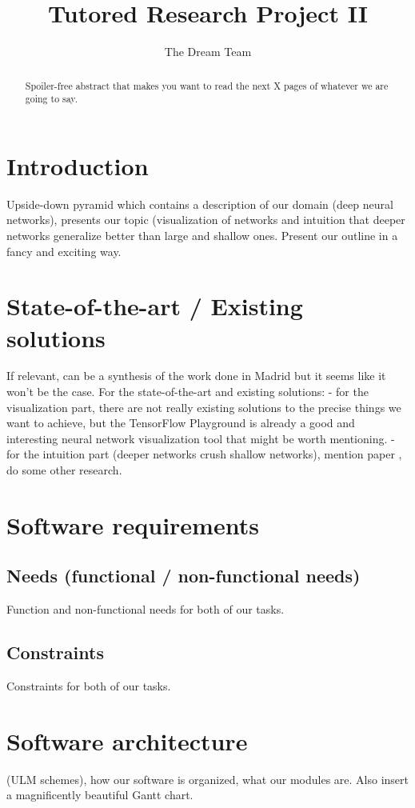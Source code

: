 \documentclass[a4paper]{article}
\title{Tutored Research Project II}
\author{The Dream Team}
\begin{document}
\maketitle

\begin{abstract}
Spoiler-free abstract that makes you want to read the next X pages of whatever we are going to say.
\end{abstract}

\section{Introduction}
Upside-down pyramid which contains a description of our domain (deep neural networks), presents our topic (visualization of networks and intuition that deeper networks generalize better than large and shallow ones. Present our outline in a fancy and exciting way.

\section{State-of-the-art / Existing solutions}
If relevant, can be a synthesis of the work done in Madrid but it seems like it won't be the case. For the state-of-the-art and existing solutions:
- for the visualization part, there are not really existing solutions to the precise things we want to achieve, but the TensorFlow Playground is already a good and interesting neural network visualization tool that might be worth mentioning.
- for the intuition part (deeper networks crush shallow networks), mention paper \citep{Mhaskar17}, do some other research.


\section{Software requirements}
\subsection{Needs (functional / non-functional needs)}
Function and non-functional needs for both of our tasks.
\subsection{Constraints}
Constraints for both of our tasks.

\section{Software architecture}
(ULM schemes), how our software is organized, what our modules are. Also insert a magnificently beautiful Gantt chart.
\end{document}
